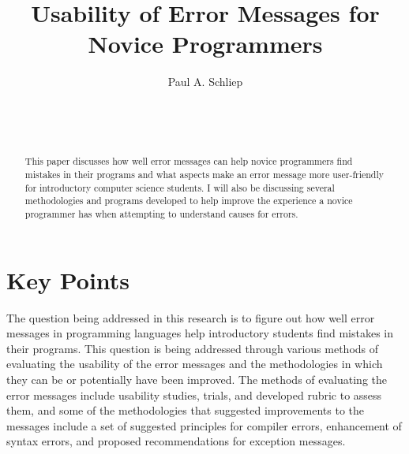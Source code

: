 \documentclass{sig-alternate}
\begin{document}

\title{Usability of Error Messages for Novice Programmers}


\author{
\alignauthor
Paul A. Schliep\\
	\\
	\\
	\\
}

\maketitle

\begin{abstract}
This paper discusses how well error messages can help novice programmers find mistakes in their programs and what aspects make an error message more user-friendly for introductory computer science students. I will also be discussing several methodologies and programs developed to help improve the experience a novice programmer has when attempting to understand causes for errors. 
\end{abstract}

\section{Key Points}

The question being addressed in this research is to figure out how well error messages in programming languages help introductory students find mistakes in their programs. This question is being addressed through various methods of evaluating the usability of the error messages and the methodologies in which they can be or potentially have been improved. The methods of evaluating the error messages include usability studies, trials, and developed rubric to assess them, and some of the methodologies that suggested improvements to the messages include a set of suggested principles for compiler errors, enhancement of syntax errors, and proposed recommendations for exception messages.
\end{document}
